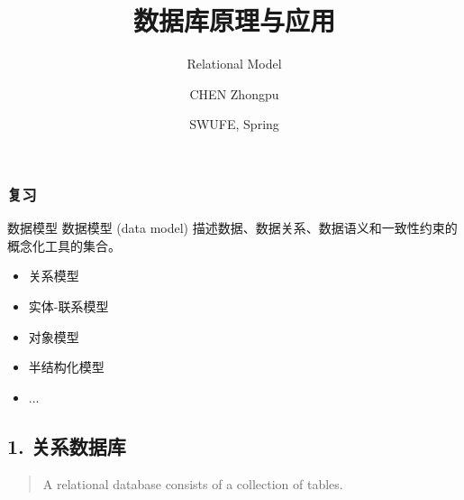 \documentclass[aspectratio=169, 14pt]{beamer}
\title[Database Principles and Applications] %
{数据库原理与应用}
\subtitle{Relational Model}
\author[CHEN Zhongpu] %
{CHEN Zhongpu}
\institute[] %
{
  School of Computing and Artificial Intelligence \\
  \href{mailto:zpchen@swufe.edu.cn}{zpchen@swufe.edu.cn}
}
\date[] %
{SWUFE, Spring \the\year{}}
\begin{document}
\frame{\titlepage}

\begin{frame}
	\frametitle{复习}
	\begin{block}{数据模型}
		数据模型 (data model) 描述数据、数据关系、数据语义和一致性约束的概念化工具的集合。
	\end{block}
	\begin{itemize}
		\item \alert{关系模型}
		\item 实体-联系模型
		\item 对象模型
		\item 半结构化模型
		\item ...
	\end{itemize}
\end{frame}

{
\begin{frame}
	\section{\textcolor{darkmidnightblue}{1. 关系数据库}}
	\begin{quote}
		A relational database consists of a collection of \alert{tables}.
	\end{quote}
\end{frame}
}
\end{document}
